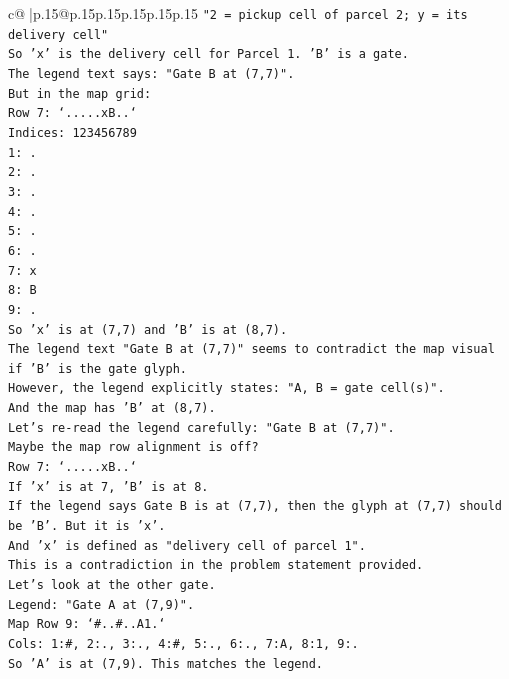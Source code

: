 \documentclass{article}
\begin{document}
{\begin{supertabular}{c@{$\;$}|p{.15\linewidth}@{}p{.15\linewidth}p{.15\linewidth}p{.15\linewidth}p{.15\linewidth}p{.15\linewidth}}
{{{\texttt{"2 = pickup cell of parcel 2; y = its delivery cell"} \\
\texttt{So 'x' is the delivery cell for Parcel 1. 'B' is a gate.} \\
\texttt{The legend text says: "Gate B at (7,7)".} \\
\texttt{But in the map grid:} \\
\texttt{Row 7: `.....xB..`} \\
\texttt{Indices: 123456789} \\
\texttt{1: .} \\
\texttt{2: .} \\
\texttt{3: .} \\
\texttt{4: .} \\
\texttt{5: .} \\
\texttt{6: .} \\
\texttt{7: x} \\
\texttt{8: B} \\
\texttt{9: .} \\
\texttt{So 'x' is at (7,7) and 'B' is at (8,7).} \\
\texttt{The legend text "Gate B at (7,7)" seems to contradict the map visual if 'B' is the gate glyph.} \\
\texttt{However, the legend explicitly states: "A, B = gate cell(s)".} \\
\texttt{And the map has 'B' at (8,7).} \\
\texttt{Let's re{-}read the legend carefully: "Gate B at (7,7)".} \\
\texttt{Maybe the map row alignment is off?} \\
\texttt{Row 7: `.....xB..`} \\
\texttt{If 'x' is at 7, 'B' is at 8.} \\
\texttt{If the legend says Gate B is at (7,7), then the glyph at (7,7) should be 'B'. But it is 'x'.} \\
\texttt{And 'x' is defined as "delivery cell of parcel 1".} \\
\texttt{This is a contradiction in the problem statement provided.} \\
\texttt{Let's look at the other gate.} \\
\texttt{Legend: "Gate A at (7,9)".} \\
\texttt{Map Row 9: `\#..\#..A1.`} \\
\texttt{Cols: 1:\#, 2:., 3:., 4:\#, 5:., 6:., 7:A, 8:1, 9:.} \\
\texttt{So 'A' is at (7,9). This matches the legend.} \\
}}}
\end{supertabular}}
\end{document}
